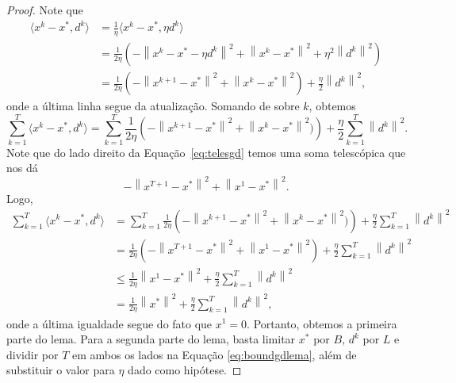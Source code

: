 \documentclass[
	12pt,				%
    oneside,			%
	a4paper,			%
	english,			%
	french,				%
	spanish,			%
	brazil,				%
	]{abntex2}
\newcommand{\norm}[1]{\left\lVert#1\right\rVert}
\begin{document}
        \begin{proof}
            Note que
            \begin{align*}
                \langle x^k - x^{*}, d^k \rangle &= \frac{1}{\eta}\langle x^k - x^{*}, \eta d^k \rangle \\
                &= \frac{1}{2\eta}\left(-\norm{x^k - x^{*} - \eta d^k}^2 + \norm{x^k - x^{*}}^2 + \eta^2\norm{d^k}^2\right) \\
                &= \frac{1}{2\eta}\left(-\norm{x^{k+1} - x^{*}}^2 + \norm{x^k - x^{*}}^2\right) + \frac{\eta}{2}\norm{d^k}^2,
            \end{align*}
            onde a última linha segue da atualização. Somando de sobre $k$, obtemos
            \begin{equation}
                \label{eq:telesgd}
                \sum_{k=1}^{T} \langle x^k - x^{*}, d^k \rangle = \sum_{k=1}^{T} \frac{1}{2\eta}\left(-\norm{x^{k+1} - x^{*}}^2 + \norm{x^k - x^{*}}^2)\right) + \frac{\eta}{2}\sum_{k=1}^{T}\norm{d^k}^2.
            \end{equation}
            Note que do lado direito da Equação~\eqref{eq:telesgd} temos uma soma telescópica que nos dá
            \begin{equation*}
                -\norm{x^{T+1} - x^{*} }^2 + \norm{x^1 - x^{*}}^2.
            \end{equation*}
            Logo,
            \begin{align*}
                \sum_{k=1}^{T} \langle x^k - x^{*}, d^k \rangle &= \sum_{k=1}^{T} \frac{1}{2\eta}\left(-\norm{x^{k+1} - x^{*}}^2 + \norm{x^k - x^{*}}^2)\right) + \frac{\eta}{2}\sum_{k=1}^{T}\norm{d^k}^2 \\
                &= \frac{1}{2\eta}(-\norm{x^{T+1} - x^{*}}^2 + \norm{x^1 - x^{*}}^2) + \frac{\eta}{2}\sum_{k=1}^{T}\norm{d^k}^2 \\
                &\leq \frac{1}{2\eta}\norm{x^{1} - x^{*}}^2 + \frac{\eta}{2}\sum_{k=1}^{T}\norm{d^k}^2 \\
                &= \frac{1}{2\eta}\norm{x^{*}}^2 + \frac{\eta}{2}\sum_{k=1}^{T}\norm{d^k}^2,
            \end{align*}
            onde a última igualdade segue do fato que $x^1 = 0$. Portanto, obtemos a primeira parte do lema. Para a segunda parte do lema, basta limitar $x^{*}$ por $B$, $d^k$ por $L$ e dividir por $T$ em ambos os lados na Equação \eqref{eq:boundgdlema}, além de substituir o valor para $\eta$ dado como hipótese.
        \end{proof}
\end{document}
